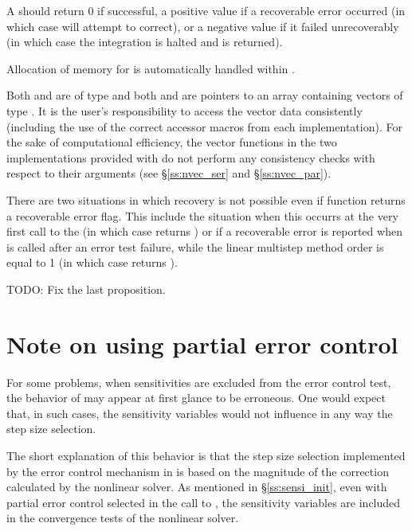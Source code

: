 {
  A  should return 0 if successful, a positive value if a recoverable
  error occurred (in which case {\idas} will attempt to correct), or a negative 
  value if it failed unrecoverably (in which case the integration is halted and
   is returned).
}
{
  Allocation of memory for  is automatically handled within {\idas}.

  Both  and  are of type  and both  and 
  are pointers to an array containing  vectors of type .
  It is the user's responsibility to access the vector data consistently 
  (including the use of the correct accessor macros from each {\nvector} implementation). 
  For the sake of computational efficiency, the vector functions in the two {\nvector} 
  implementations provided with {\idas} do not perform any consistency checks with respect 
  to their  arguments (see \S\ref{ss:nvec_ser} and \S\ref{ss:nvec_par}).

  There are two situations in which recovery is not possible even if 
  function returns a recoverable error flag. This include the situation when this
  occurrs at the very first call to the  (in which case {\idas} returns
  ) or if a recoverable error is reported when 
  is called after an error test failure, while the linear multistep method order is
  equal to 1 (in which case {\idas} returns ).

\bigskip TODO: Fix the last proposition.
}


\section{Note on using partial error control}\label{ss:partial}
For some problems, when sensitivities are excluded from the error control test, 
the behavior of {\idas} may appear at first glance to be erroneous. One would
expect that, in such cases, the sensitivity variables would not influence in
any way the step size selection.

The short explanation of this behavior is that the step size selection
implemented by the error control mechanism in {\idas} is based on the 
magnitude of the correction calculated by the nonlinear solver. As mentioned
in \S\ref{ss:sensi_init}, even with partial error control selected
in the call to , the sensitivity variables are included
in the convergence tests of the nonlinear solver.

